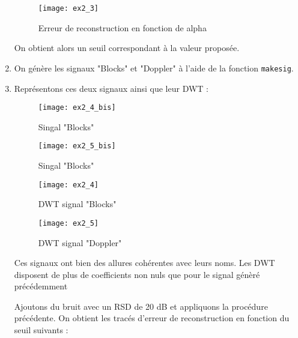 \documentclass[12pt,a4paper,titlepage]{article}
\begin{document}
\begin{enumerate}
{                \begin{figure}[H]
                    \caption{Erreur de reconstruction en fonction de alpha}
                    \texttt{[image: ex2\_3]}
                    \centering
                \end{figure}

                On obtient alors un seuil correspondant à la valeur proposée.
            }

        \item{On génère les signaux "Blocks" et "Doppler" à l'aide de la
            fonction \texttt{makesig}.}

        \item{Représentons ces deux signaux ainsi que leur DWT :

                \begin{figure}[H]
                    \caption{Singal "Blocks"}
                    \texttt{[image: ex2\_4\_bis]}
                    \centering
                \end{figure}

                \begin{figure}[H]
                    \caption{Singal "Blocks"}
                    \texttt{[image: ex2\_5\_bis]}
                    \centering
                \end{figure}

                \begin{figure}[H]
                    \caption{DWT signal "Blocks"}
                    \texttt{[image: ex2\_4]}
                    \centering
                \end{figure}

                \begin{figure}[H]
                    \caption{DWT signal "Doppler"}
                    \texttt{[image: ex2\_5]}
                    \centering
                \end{figure}

                Ces signaux ont bien des allures cohérentes avec leurs noms. Les DWT disposent
                de plus de coefficients non nuls que pour le signal génèré précédemment

                Ajoutons du bruit avec un RSD de 20 dB et appliquons la
                procédure précédente. On obtient les tracés d'erreur de
                reconstruction en fonction du seuil suivants :

}
\end{enumerate}
\end{document}
